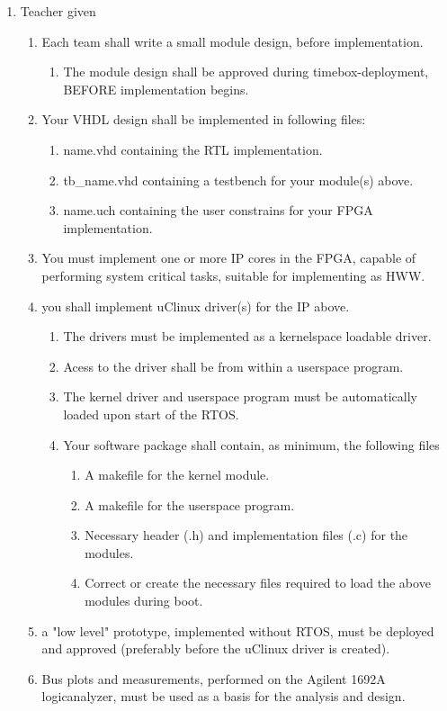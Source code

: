 \documentclass[12pt,a4paper]{report}
\begin{document}
\begin{enumerate}
\item Teacher given
\begin{enumerate}
	\item Each team shall write a small module design, before implementation.
	\begin{enumerate}
		\item The module design shall be approved during timebox-deployment, BEFORE implementation begins.
	\end{enumerate}
	\item Your VHDL design shall be implemented in following files:
	\begin{enumerate}
		\item name.vhd containing the RTL implementation.
		\item tb\_name.vhd containing a testbench for your module(s) above.
		\item name.uch containing the user constrains for your FPGA implementation.
	\end{enumerate}
	\item You must implement one or more IP cores in the FPGA, capable of performing system critical tasks, suitable for implementing as HWW.
	\item you shall implement uClinux driver(s) for the IP above.
	\begin{enumerate}
		\item The drivers must be implemented as a kernelspace loadable driver.
		\item Acess to the driver shall be from within a userspace program.
		\item The kernel driver and userspace program must be automatically loaded upon start of the RTOS.
		\item Your software package shall contain, as minimum, the following files
		\begin{enumerate}
			\item A makefile for the kernel module.
			\item A makefile for the userspace program.
			\item Necessary header (.h) and implementation files (.c) for the modules.
			\item Correct or create the necessary files required to load the above modules during boot.
		\end{enumerate}
	\end{enumerate}
	\item a "low level" prototype, implemented without RTOS, must be deployed and approved (preferably before the uClinux driver is created).
	\item Bus plots and measurements, performed on the Agilent 1692A logicanalyzer, must be used as a basis for the analysis and design.
	

\end{enumerate}
\end{enumerate}
\end{document}
